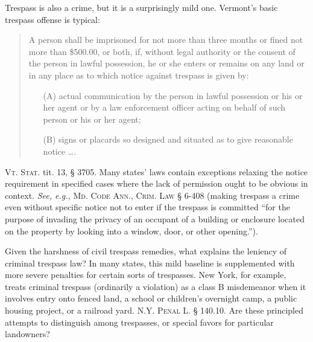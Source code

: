 Trespass is also a crime, but it is a surprisingly mild one. Vermont's basic
trespass offense is typical:
\begin{quote}
A person shall be imprisoned for not more than three months or fined not more
than \$500.00, or both, if, without legal authority or the consent of the
person in lawful possession, he or she enters or remains on any land or in any
place as to which notice against trespass is given by:
\begin{itemize}
\item[(A)] actual communication by the person in lawful possession or his or her
agent or by a law enforcement officer acting on behalf of such person or his or
her agent;

\item[(B)] signs or placards so designed and situated as to give reasonable
notice \ldots.
\end{itemize}
\end{quote}
\textsc{Vt. Stat.} tit. 13, {\S} 3705. Many states' laws contain exceptions
relaxing the notice requirement in specified cases where the lack of permission
ought to be obvious in context. \textit{See, e.g.,} \textsc{Md. Code Ann.,
Crim. Law} {\S} 6-408 (making trespass a crime even without specific notice not
to enter if the trespass is committed ``for the purpose of invading the privacy
of an occupant of a building or enclosure located on the property by looking
into a window, door, or other opening.'').

Given the harshness of civil trespass remedies,
what
explains the leniency of criminal trespass law? In many states, this mild
baseline is supplemented with more severe penalties for certain sorts of
trespasses. New York, for example, treats criminal trespass (ordinarily a
violation) as a class B misdemeanor when it involves entry onto fenced land, a
school or children's overnight camp, a public housing project, or a railroad
yard. \textsc{N.Y. Penal L. {\S} 140.10}. Are these principled attempts to
distinguish among trespasses, or special favors for particular landowners?

